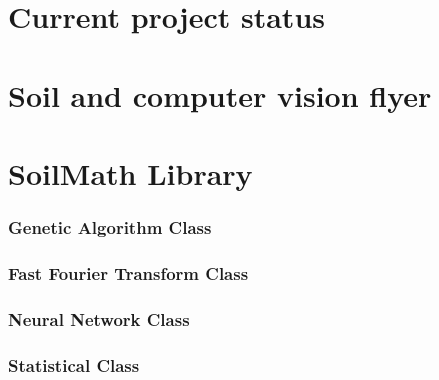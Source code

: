 \documentclass[11pt,fleqn,,a4paper,twoside,openright]{book}
\begin{document}
\chapter{Current project status}

\chapter{Soil and computer vision flyer}


\chapter{SoilMath Library}
\subsection*{Genetic Algorithm Class}


\newpage
\subsection*{Fast Fourier Transform Class}


\newpage
\subsection*{Neural Network Class}


\newpage
\subsection*{Statistical Class}


\newpage
\end{document}
